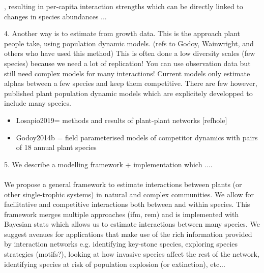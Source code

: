 \documentclass[a4,12pt]{article}
\begin{document}
    , resulting in per-capita interaction strengths which can be directly linked to changes in species abundances ...


    4. Another way is to estimate from growth data. This is the approach plant people take, using population dynamic models. (refs to Godoy, Wainwright, and others who have used this method) This is often done a low diversity scales (few species) because we need a lot of replication! 
    You can use observation data but still need complex models for many interactions! Current models only estimate alphas between a few species and keep them competitive. 
        There are few however, published plant population dynamic models which are explicitely developped to include many species.

        \begin{itemize}
            \item Losapio2019= methods and results of plant-plant networks [refhole]
            \item Godoy2014b = field parameterised models of competitor dynamics with pairs of 18 annual plant species
        \end{itemize}


    5. We describe a modelling framework + implementation which ....
    
    \paragraph{}
    We propose a general framework to estimate interactions between plants (or other single-trophic systems) in natural and complex communities. We allow for facilitative and competitive interactions both between and within species. 
    This framework merges multiple approaches (ifm, rem) and is implemented with Bayesian stats which allows us to estimate interactions between many species. 
    We suggest avenues for applications that make use of the rich information provided by interaction networks e.g. identifying key-stone species, exploring species strategies (motifs?), looking at how invasive species affect the rest of the network, identifying species at risk of population explosion (or extinction), etc...

\end{document}
